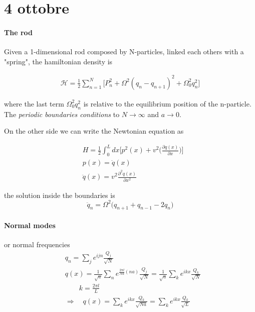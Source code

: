 \documentclass[class=article]{standalone}
\begin{document}
\section{4 ottobre}
\paragraph{The rod}
Given a 1-dimensional rod composed by N-particles, linked each others with a "spring", the hamiltonian density is

\begin{equation*}
\begin{split}
\mathcal{H} = \frac{1}{2} \sum_{n=1}^{N} \Big[  P_n^2 + \Omega^2 (q_n - q_{n+1})^2 + \Omega_0^2 q_n^2 \Big]
\end{split}
\end{equation*}

where the last term $\Omega_0^2 q_n^2$ is relative to the equilibrium position of the n-particle.
The \emph{periodic boundaries conditions} to $N \to \infty$ and $a \to 0$.

On the other side we can write the Newtonian equation as 

\begin{equation*}
\begin{split}
& H = \frac{1}{2} \int_{0}^{L} dx \Big[ p^2(x) + v^2 \Big( \frac{\partial q(x)}{\partial x} \Big) \Big] \\
&  p(x) = \dot q(x) \\
&  \ddot q(x) = v^2 \frac{\partial^2 q(x)}{\partial x^2}
\end{split}
\end{equation*}

the solution inside the boundaries is
\begin{equation*}
\ddot q_n = \Omega^2 \Big( q_{n+1} + q_{n-1} -2 q_n \Big)
\end{equation*}


\paragraph{Normal modes} or normal frequencies
\begin{equation*}
\begin{split}
& q_n = \sum_j e^{i j n} \frac{Q_j}{\sqrt{N}} \\
& q(x) =  \frac{1}{\sqrt{a} } \sum_n e^{ \frac{2 \pi l}{N a} (n a) } \frac{Q_j}{\sqrt{N}}  = \frac{1}{\sqrt{a} }  \sum_k e^{i k x} \frac{Q_k}{\sqrt{N}} \\
& \quad\quad k = \frac{2 \pi l}{L} \\
& \Rightarrow\quad q(x) =  \sum_k e^{i k x} \frac{Q_k}{\sqrt{N a}} =  \sum_k e^{i k x} \frac{Q_k}{\sqrt{L}}
\end{split}
\end{equation*}
\end{document}
